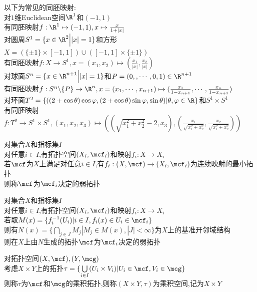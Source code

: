 \begin{zhu}
以下为常见的同胚映射:\\
对$1$维Euclidean空间$\R^1$和$(-1,1)$\\
有同胚映射$f:\R^1\mapsto (-1,1),x\mapsto \frac{x}{1+|x|}$\\
对圆周$S^{1}=\{x\in\R^2\Big||x|=1\}$和方形$X=(\{\pm 1\}\times[-1,1])\cup([-1,1]\times\{\pm 1\})$\\
有同胚映射$f:X\to S^1,x=(x_1,x_2)\mapsto(\frac{x_1}{|x|},\frac{x_2}{|x|})$\\
对球面$S^{n}=\{x\in \R^{n+1}\Big||x|=1\}$和$P=(0,,\cdots,0,1)\in \R^{n+1}$\\
有同胚映射$f:S^{n}\backslash\{P\}\to \R^n,x=(x_1,\cdots,x_{n+1})\mapsto (\frac{x_1}{1-x_{n+1}},\cdots,\frac{x_n}{1-x_{n+1}})$\\
对环面$T^2=\{((2+\cos\theta)\cos\varphi,(2+\cos\theta)\sin\varphi,\sin\theta)|\theta,\varphi\in\R\}$和$S^{1}\times S^1$\\
有同胚映射$f:T^2\to S^{1}\times S^{1},(x_1,x_2,x_3)\mapsto ((\sqrt{x_1^2+x_2^2}-2,x_3),(\frac{x_1}{\sqrt{x_1^2+x_2^2}},\frac{x_2}{\sqrt{x_1^2+x_2^2}}))$
\end{zhu}

\begin{dingyi}
对集合$X$和指标集$I$\\
对任意$i\in I$,有拓扑空间$(X_i,\mcf_i)$和映射$f_i:X\to X_i$\\
若$\mcf$为$X$上满足对任意$i\in I$,有$f_i:(X,\mcf)\to (X_i,\mcf_i)$为连续映射的最小拓扑\\
则称$\mcf$为$\mcf_i$决定的弱拓扑
\end{dingyi}

\begin{dingli}
对集合$X$和指标集$I$\\
对任意$i\in I$,有拓扑空间$(X_i,\mcf_i)$和映射$f_i:X\to X_i$\\
若取$M(x)=\{f_i^{-1}(U_i)|i\in I,f_i(x)\in U_i\in \mcf_i\}$\\
则有$N(x)=\{\bigcap\limits_{j\in J}M_j|M_j\in M(x),|J|<\infty\}$为$X$上的基准开邻域结构\\
则在$X$上由$N$生成的拓扑$\mcf$为$\mcf_i$决定的弱拓扑
\end{dingli}

\begin{dingyi}
对拓扑空间$(X,\mcf),(Y,\mcg)$\\
考虑$X\times Y$上的拓扑$\tau=\{\bigcup\limits_{i\in I}(U_{i}\times V_i)|U_i\in \mcf,V_i\in \mcg\}$\\
则称$\tau$为$\mcf$和$\mcg$的乘积拓扑,则称$(X\times Y,\tau)$为乘积空间,记为$X\times Y$
\end{dingyi}

